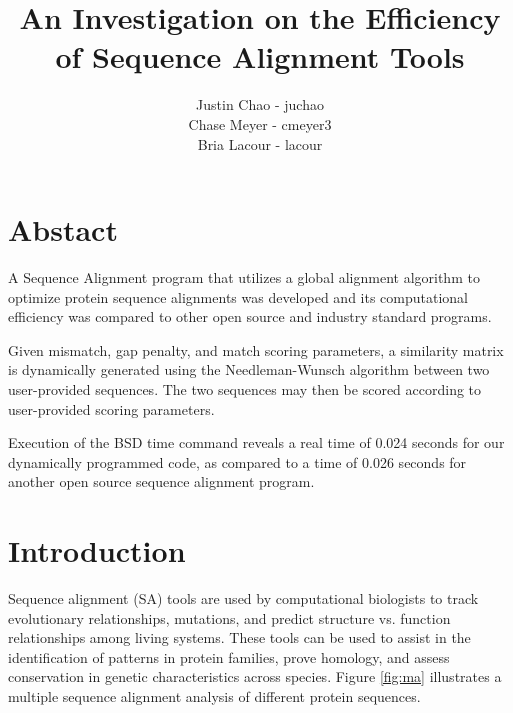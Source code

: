 \documentclass{article}
\newcommand{\subtitle}[1]{%
    \posttitle{%
        \par\end{center}
        \begin{center}\LARGE#1\end{center}
        \vskip0.5em}%
}
\begin{document}
\title{An Investigation on the Efficiency of Sequence Alignment Tools}
\subtitle{Final Report}
\author {Justin Chao - juchao \\
		Chase Meyer - cmeyer3 \\
		Bria Lacour - lacour}
\maketitle
\vspace{4cm}
\section*{Abstact} 
A Sequence Alignment program that utilizes a global alignment algorithm to
optimize protein sequence alignments was developed and its computational
efficiency was compared to other open source and industry standard programs.
 
Given mismatch, gap penalty, and match scoring parameters, a similarity matrix is
dynamically generated using the Needleman-Wunsch algorithm between two
user-provided sequences.  
The two sequences may then be scored according to user-provided scoring
parameters.

Execution of the BSD time command reveals a real time of 0.024 seconds for our
dynamically programmed code, as compared to a time of 0.026 seconds for another
open source sequence alignment program.

\newpage

\section*{Introduction}
Sequence alignment (SA) tools are used by computational biologists to track evolutionary
relationships, mutations, and predict structure vs. function relationships among living
systems. These tools can be used to assist in the identification of patterns in protein
families, prove homology, and assess conservation in genetic characteristics across species.
Figure \ref{fig:ma} illustrates a multiple sequence alignment analysis of
different protein sequences.
\end{document}
